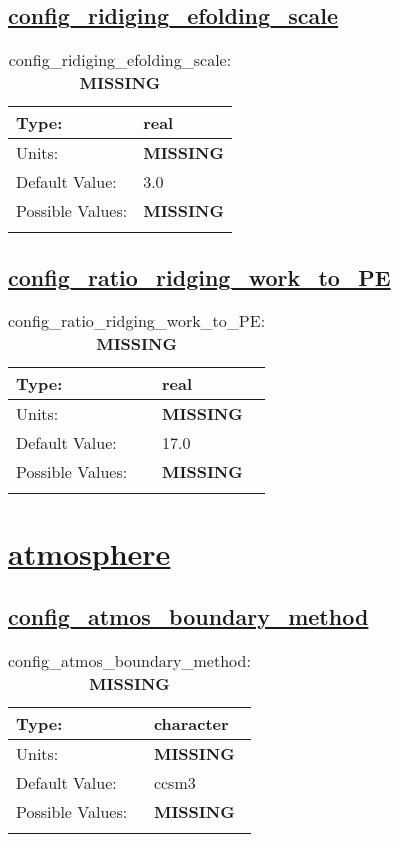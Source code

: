 \subsection[config\_ridiging\_efolding\_scale]{\hyperref[sec:nm_tab_ridging]{config\_ridiging\_efolding\_scale}}
\label{subsec:nm_sec_config_ridiging_efolding_scale}
\begin{center}
\begin{longtable}{| p{2.0in} || p{4.0in} |}
    \hline
    Type: & real \\
    \hline
    Units: & {\bf \color{red} MISSING} \\
    \hline
    Default Value: & 3.0 \\
    \hline
    Possible Values: & {\bf \color{red} MISSING} \\
    \hline
    \caption{config\_ridiging\_efolding\_scale: {\bf \color{red} MISSING}}
\end{longtable}
\end{center}
\subsection[config\_ratio\_ridging\_work\_to\_PE]{\hyperref[sec:nm_tab_ridging]{config\_ratio\_ridging\_work\_to\_PE}}
\label{subsec:nm_sec_config_ratio_ridging_work_to_PE}
\begin{center}
\begin{longtable}{| p{2.0in} || p{4.0in} |}
    \hline
    Type: & real \\
    \hline
    Units: & {\bf \color{red} MISSING} \\
    \hline
    Default Value: & 17.0 \\
    \hline
    Possible Values: & {\bf \color{red} MISSING} \\
    \hline
    \caption{config\_ratio\_ridging\_work\_to\_PE: {\bf \color{red} MISSING}}
\end{longtable}
\end{center}
\section[atmosphere]{\hyperref[sec:nm_tab_atmosphere]{atmosphere}}
\label{sec:nm_sec_atmosphere}
\subsection[config\_atmos\_boundary\_method]{\hyperref[sec:nm_tab_atmosphere]{config\_atmos\_boundary\_method}}
\label{subsec:nm_sec_config_atmos_boundary_method}
\begin{center}
\begin{longtable}{| p{2.0in} || p{4.0in} |}
    \hline
    Type: & character \\
    \hline
    Units: & {\bf \color{red} MISSING} \\
    \hline
    Default Value: & ccsm3 \\
    \hline
    Possible Values: & {\bf \color{red} MISSING} \\
    \hline
    \caption{config\_atmos\_boundary\_method: {\bf \color{red} MISSING}}
\end{longtable}
\end{center}
